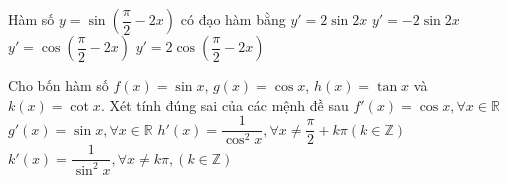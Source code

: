 \begin{ex}%
	Hàm số $y = \sin \left( \dfrac{\pi  }{2} - 2x \right)$ có đạo hàm bằng
	\choice 
		{$y'  = 2\sin 2x$}
		{\True $y' = - 2\sin 2x$} 
		{$y'  = \cos \left( \dfrac{\pi }{2} - 2x \right)$}
		{$y' = 2\cos \left( \dfrac{\pi }{2}  - 2x \right)$}
\end{ex}

\begin{ex}%
 Cho bốn hàm số $f(x)=\sin x$, $g(x)=\cos  x$, $h(x)=\tan x$ và $k(x)=\cot x$. Xét tính đúng sai của các mệnh đề sau
 \choiceTF 
  {\True $f'(x)=\cos  x, \forall x\in\mathbb{R}$}
  {$g'(x)=\sin  x, \forall x\in\mathbb{R}$}
  {\True $h'(x)=\dfrac{1}{\cos^2x}, \forall x\neq  \dfrac{\pi}{2}+k\pi\left(k\in\mathbb{Z}\right)$}
   {$k'(x)=\dfrac{1}{\sin^2x}, \forall x\neq k\pi, \left(k\in\mathbb{Z}\right)$}
\end{ex}

